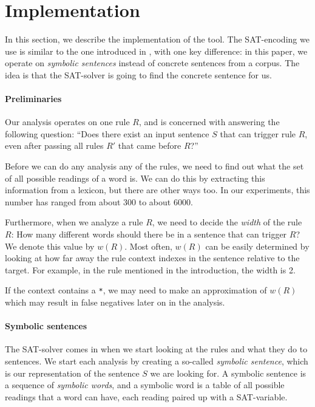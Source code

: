 \section{Implementation}
\label{sec:implementation}

In this section, we describe the implementation of the tool.
The SAT-encoding we use is similar to the one introduced in \cite{listenmaa_claessen2015}, with one key difference: in this paper, we operate on {\em symbolic sentences} instead of concrete sentences from a corpus. The idea is that the SAT-solver is going to find the concrete sentence for us.

\paragraph{Preliminaries}

Our analysis operates on one rule $R$, and is concerned with answering the following question: ``Does there exist an input sentence $S$ that can trigger rule $R$, even after passing all rules $R'$ that came before $R$?''

Before we can do any analysis any of the rules, we need to find out what the set of all possible readings of a word is. We can do this by extracting this information from a lexicon, but there are other ways too. In our experiments, this number has ranged from about 300 to about 6000. 

Furthermore, when we analyze a rule $R$, we need to decide the {\em width} of the rule $R$: How many different words should there be in a sentence that can trigger $R$? We denote this value by $w(R)$. Most often, $w(R)$ can be easily determined by looking at how far away the rule context indexes in the sentence relative to the target. For example, in the rule mentioned in the introduction, the width is 2.

If the context contains a \verb!*!, we may need to make an approximation of $w(R)$ which may result in false negatives later on in the analysis.

\paragraph{Symbolic sentences}

The SAT-solver comes in when we start looking at the rules and what they do to sentences. We start each analysis by creating a so-called {\em symbolic sentence}, which is our representation of the sentence $S$ we are looking for. A symbolic sentence is a sequence of {\em symbolic words}, and a symbolic word is a table of all possible readings that a word can have, each reading paired up with a SAT-variable.

